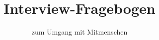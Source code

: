 \documentclass[a4paper,12pt]{scrartcl}
\begin{document}
\title{Interview-Fragebogen}
\author{zum Umgang mit Mitmenschen}
\date{}
\maketitle

\begin{abstract}

\end{abstract}
\end{document}
